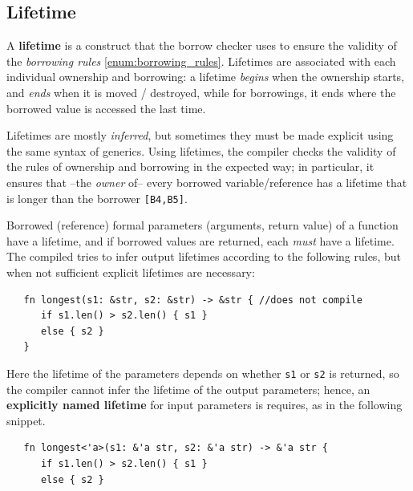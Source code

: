 \subsection{Lifetime}
A \textbf{lifetime} is a construct that the borrow checker uses to ensure the validity of the \textit{borrowing rules} \ref{enum:borrowing_rules}.
Lifetimes are associated with each individual ownership
and borrowing: 
a lifetime \textit{begins} when the ownership starts, and \textit{ends}
when it is moved / destroyed, 
while for borrowings, it ends where the borrowed value is
accessed the last time.

Lifetimes are mostly \textit{inferred},
but sometimes they must be made explicit using the same syntax of generics.
Using lifetimes, the compiler checks the validity of the
rules of ownership and borrowing in the expected way;
in particular, it ensures that {--}the \textit{owner} of{--} every
borrowed variable/reference has a lifetime that is longer
than the borrower \texttt{[B4,B5]}.
\nl

Borrowed (reference) formal parameters (arguments, return value) of a function have a
lifetime, and  
if borrowed values are returned, each \textit{must} have a lifetime.\\
The compiled tries to infer output lifetimes according to the following rules, but when not sufficient explicit lifetimes are necessary:

\begin{lstlisting}
   fn longest(s1: &str, s2: &str) -> &str { //does not compile
      if s1.len() > s2.len() { s1 }
      else { s2 }
   }
\end{lstlisting}
Here the lifetime of the parameters depends on whether \lstinline|s1| or \lstinline|s2| is returned,
so the compiler cannot infer the lifetime of the output parameters;
hence, an \textbf{explicitly named lifetime} for input parameters is requires, as in the following snippet.
\begin{lstlisting}
   fn longest<'a>(s1: &'a str, s2: &'a str) -> &'a str {
      if s1.len() > s2.len() { s1 }
      else { s2 }
\end{lstlisting}
\newpage

